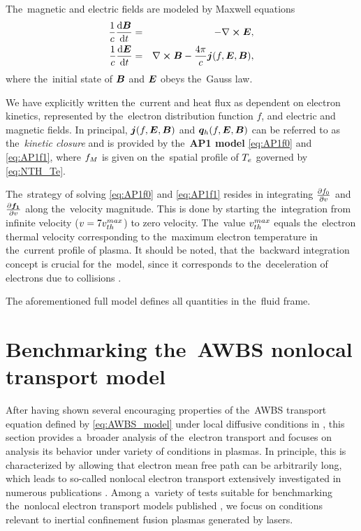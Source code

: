 The~magnetic and electric fields are modeled by Maxwell equations
\begin{eqnarray}
  \frac{1}{c}\frac{\text{d} \boldsymbol{B}}{\text{d} t} &=& - \nabla\boldsymbol{\times}\boldsymbol{E}
  ,
  \label{eq:Faraday} \\
  \frac{1}{c}\frac{\text{d} \boldsymbol{E}}{\text{d} t} &=& \nabla\boldsymbol{\times}\boldsymbol{B} - \frac{4\pi}{c}
  \boldsymbol{j}(f, \boldsymbol{E}, \boldsymbol{B})
  ,
  \label{eq:Ampere}
\end{eqnarray}
where the~initial state of $\boldsymbol{B}$ and $\boldsymbol{E}$ obeys the~Gauss law.

We have explicitly written the~current and heat flux as dependent on
electron kinetics, represented by the~electron distribution function $f$,
and electric and magnetic fields. In principal, $\boldsymbol{j}(f, \boldsymbol{E}, \boldsymbol{B})$
and $\boldsymbol{q}_h(f, \boldsymbol{E}, \boldsymbol{B})$ can be referred to as the~\textit{kinetic closure}
and is provided by the~{\bf AP1 model} \eqref{eq:AP1f0} and \eqref{eq:AP1f1},
where $f_M$ is given on the~spatial profile of $T_e$ 
governed by \eqref{eq:NTH_Te}.

The~strategy of solving 
\eqref{eq:AP1f0} and \eqref{eq:AP1f1} resides in integrating 
$\frac{\partial{f_0}}{\partial{v}}$
and $\frac{\partial{\boldsymbol{f_1}}}{\partial{v}}$ along the~velocity magnitude. 
This is done by starting the~integration
from infinite velocity ($v = 7 v_{th}^{max}$) to zero velocity. The~value
$v_{th}^{max}$ equals the~electron thermal velocity corresponding to the~maximum 
electron temperature in the~current profile of plasma.
It should be noted, that the~backward integration concept is crucial for 
the~model, since it corresponds to the~deceleration of electrons due to 
collisions \cite{Touati_2014}. 

The aforementioned full model defines all quantities 
in the~fluid frame.

\section{Benchmarking the~AWBS nonlocal transport model}
\label{sec:BenchmarkingAWBS}
After having shown several encouraging properties of the~AWBS transport 
equation defined by \eqref{eq:AWBS_model} under local diffusive conditions
in , this section provides a~broader analysis
of the~electron transport and focuses on analysis its behavior under variety of
conditions in plasmas. In principle, this is characterized by allowing that
electron mean free path can be arbitrarily long, which leads to so-called 
nonlocal electron transport extensively investigated in numerous publications 
\cite{Malone_1975_15, Colombant_PoP2005, Bell_1981_83, LMV_1983_7, Brantov_Nonlocal_electron_transport_1998, schurtz2000, Sorbo_2015}.
Among a~variety of tests suitable for benchmarking the~nonlocal electron 
transport models published 
\cite{Epperlein_PoFB1991, marocchino2013, Sorbo_2015, 
Sorbo_2016, Sherlock_PoP2017, Brodrick_PoP2017}, we focus on 
conditions relevant to inertial confinement fusion plasmas generated by lasers.


